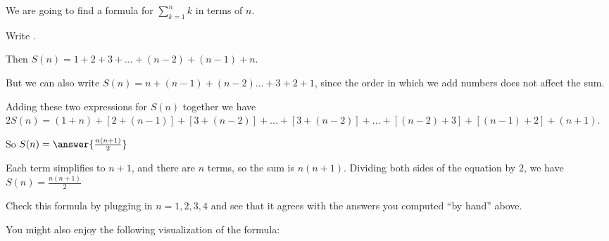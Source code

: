 \documentclass{ximera}
\begin{document}
\begin{question}
	We are going to find a formula for $\sum_{k=1}^{n} k$ in terms of $n$.
	
	Write  .
	
	Then $S(n) = 1+2+3+\dots+(n-2)+(n-1)+n$.
	
	But we can also write $S(n) = n+(n-1)+(n-2)...+3+2+1$, since the order in which we add numbers does not affect the sum.
	
	Adding these two expressions for $S(n)$ together we have $2S(n) = (1+n)+[2+(n-1)]+[3+(n-2)]+...+[3+(n-2)]+...+[(n-2)+3]+[(n-1)+2]+(n+1)$.
		
	So $S(n) = \answer{\frac{n(n+1)}{2}}$ 
	 \begin{hint}
	 	 Each term simplifies to $n+1$, and there are $n$ terms, so the sum is $n(n+1)$.  Dividing both sides of the equation by $2$, we have $S(n) = \frac{n(n+1)}{2}$
	 \end{hint}
	 
	 Check this formula by plugging in $n=1,2,3,4$ and see that it agrees with the answers you computed ``by hand'' above.
	 
	 \begin{multipleChoice}
	 \end{multipleChoice}
	 
	 You might also enjoy the following visualization of the formula:
	 
\end{question}
\end{document}
